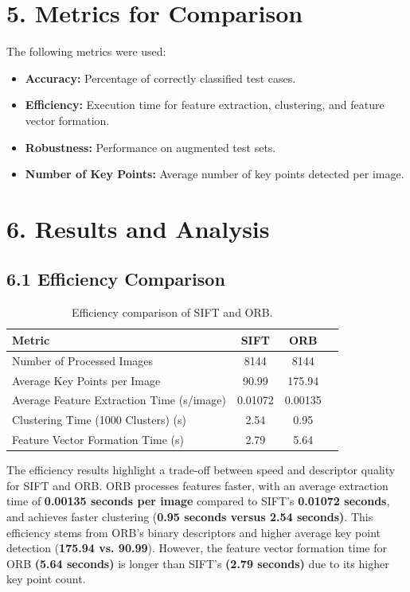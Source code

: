\documentclass[12pt]{article}
\begin{document}
\section*{5. Metrics for Comparison}
The following metrics were used:
\begin{itemize}
    \item \textbf{Accuracy:} Percentage of correctly classified test cases.
    \item \textbf{Efficiency:} Execution time for feature extraction, clustering, and feature vector formation.
    \item \textbf{Robustness:} Performance on augmented test sets.
    \item \textbf{Number of Key Points:} Average number of key points detected per image.
\end{itemize}

\section*{6. Results and Analysis}

\subsection*{6.1 Efficiency Comparison}
\begin{table}[H]
\centering
\begin{tabular}{@{}lccc@{}}
\toprule
\textbf{Metric}                            & \textbf{SIFT}   & \textbf{ORB}    \\ \midrule
Number of Processed Images                 & 8144            & 8144            \\
Average Key Points per Image               & 90.99           & 175.94          \\
Average Feature Extraction Time (s/image)  & 0.01072         & 0.00135         \\
Clustering Time (1000 Clusters) (s)        & 2.54            & 0.95            \\
Feature Vector Formation Time (s)          & 2.79            & 5.64            \\ \bottomrule
\end{tabular}
\caption{Efficiency comparison of SIFT and ORB.}
\label{tab:efficiency_comparison}
\end{table}

\textbf{} 
The efficiency results highlight a trade-off between speed and descriptor quality for SIFT and ORB. ORB processes features faster, with an average extraction time of \textbf{0.00135 seconds per image} compared to SIFT's \textbf{0.01072 seconds}, and achieves faster clustering (\textbf{0.95 seconds versus 2.54 seconds)}. This efficiency stems from ORB's binary descriptors and higher average key point detection (\textbf{175.94 vs. 90.99}). However, the feature vector formation time for ORB \textbf{(5.64 seconds)} is longer than SIFT's \textbf{(2.79 seconds)} due to its higher key point count. 
\end{document}
